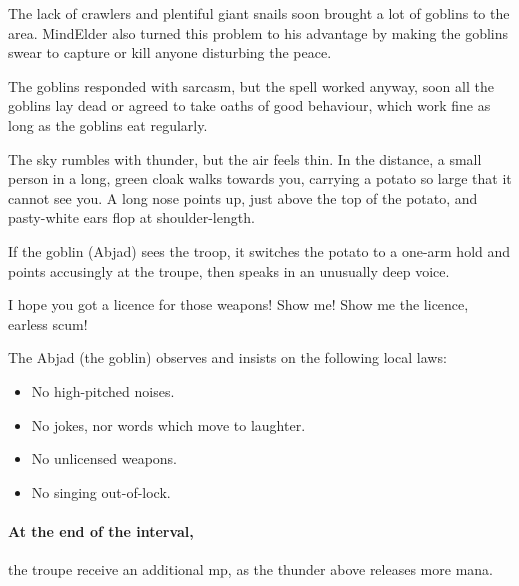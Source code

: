 
\begin{exampletext}
  The lack of \glspl{crawler} and plentiful giant snails soon brought a lot of goblins to the area.
  \Gls{MindElder} also turned this problem to his advantage by making the goblins swear to capture or kill anyone disturbing the peace.

  The goblins responded with sarcasm, but the spell worked anyway, soon all the goblins lay dead or agreed to take oaths of good behaviour, which work fine as long as the goblins eat regularly.
\end{exampletext}

\begin{boxtext}
  The sky rumbles with thunder, but the air feels thin.
  In the distance, a small person in a long, green cloak walks towards you, carrying a potato so large that it cannot see you.
  A long nose points up, just above the top of the potato, and pasty-white ears flop at shoulder-length.
\end{boxtext}

If the goblin (Abjad) sees the troop, it switches the potato to a one-arm hold and points accusingly at the troupe, then speaks in an unusually deep voice.

\begin{speechtext}
  I hope you got a licence for those weapons!
  Show me!
  Show me the licence, earless scum!
\end{speechtext}

The Abjad (the goblin) observes and insists on the following local laws:


\begin{itemize}
  \item
  No high-pitched noises.
  \item
  No jokes, nor words which move to laughter.
  \item
  No unlicensed weapons.
  \item
  No singing out-of-lock.
\end{itemize}


\paragraph{At the end of the \gls{interval},}
the troupe receive an additional \gls{mp}, as the thunder above releases more mana.

